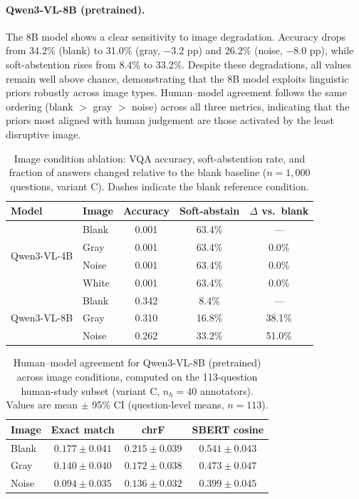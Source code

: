 \documentclass[letterpaper]{article}
\begin{document}
\paragraph{Qwen3-VL-8B (pretrained).}
The 8B model shows a clear sensitivity to image degradation.  Accuracy drops
from 34.2\% (blank) to 31.0\% (gray, $-3.2$ pp) and 26.2\% (noise, $-8.0$
pp), while soft-abstention rises from 8.4\% to 33.2\%.  Despite these
degradations, all values remain well above chance, demonstrating that the 8B
model exploits linguistic priors robustly across image types.  Human--model
agreement follows the same ordering (blank $>$ gray $>$ noise) across all
three metrics, indicating that the priors most aligned with human judgement are
those activated by the least disruptive image.

\begin{table}[h]
\centering
\caption{Image condition ablation: VQA accuracy, soft-abstention rate, and
  fraction of answers changed relative to the blank baseline ($n=1{,}000$
  questions, variant C).  Dashes indicate the blank reference condition.}
\label{tab:image_ablation_acc}
\setlength{\tabcolsep}{6pt}
\begin{tabular}{llccc}
\toprule
\textbf{Model} & \textbf{Image} & \textbf{Accuracy} & \textbf{Soft-abstain} & \textbf{$\Delta$ vs.\ blank} \\
\midrule
\multirow{4}{*}{Qwen3-VL-4B} & Blank  & 0.001 & 63.4\% & ---   \\
                              & Gray   & 0.001 & 63.4\% & 0.0\% \\
                              & Noise  & 0.001 & 63.4\% & 0.0\% \\
                              & White  & 0.001 & 63.4\% & 0.0\% \\
\midrule
\multirow{3}{*}{Qwen3-VL-8B} & Blank  & 0.342 & 8.4\%  & ---    \\
                              & Gray   & 0.310 & 16.8\% & 38.1\% \\
                              & Noise  & 0.262 & 33.2\% & 51.0\% \\
\bottomrule
\end{tabular}
\end{table}

\begin{table}[h]
\centering
\caption{Human--model agreement for Qwen3-VL-8B (pretrained) across image
  conditions, computed on the 113-question human-study subset (variant C,
  $n_h = 40$ annotators).  Values are mean $\pm$ 95\% CI (question-level
  means, $n=113$).}
\label{tab:image_ablation_hm}
\setlength{\tabcolsep}{8pt}
\begin{tabular}{lccc}
\toprule
\textbf{Image} & \textbf{Exact match} & \textbf{chrF} & \textbf{SBERT cosine} \\
\midrule
Blank & $0.177 \pm 0.041$ & $0.215 \pm 0.039$ & $0.541 \pm 0.043$ \\
Gray  & $0.140 \pm 0.040$ & $0.172 \pm 0.038$ & $0.473 \pm 0.047$ \\
Noise & $0.094 \pm 0.035$ & $0.136 \pm 0.032$ & $0.399 \pm 0.045$ \\
\bottomrule
\end{tabular}
\end{table}
\end{document}
